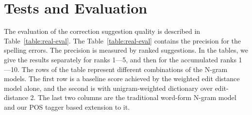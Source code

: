 \documentclass[postprint]{flammie}
\begin{document}
\section{Tests and Evaluation}
\label{sec:evaluation}

The evaluation of the correction suggestion quality is described in
Table~\ref{table:real-eval}. The Table~\ref{table:real-eval} contains the
precision for the spelling errors. The precision is measured by ranked
suggestions. In the tables, we give the results separately for ranks 1---5, and
then for the accumulated ranks 1---10.  The  rows of the table represent
different combinations of the N-gram models. The first row is a baseline score
achieved by the weighted edit distance model alone, and the second is with
unigram-weighted dictionary over edit-distance 2. The last two columns are the
traditional word-form N-gram model and our POS tagger based extension to it.
\end{document}
